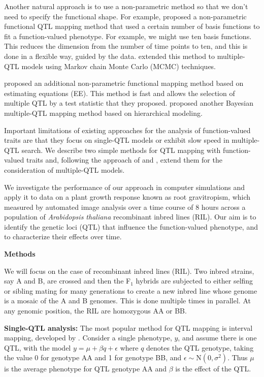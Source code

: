 \documentclass[12pt,letterpaper]{article}
\begin{document}
Another natural approach is to use a non-parametric method so that we don't need
to specify the functional shape. For example, \citet{Yang2009}
proposed a non-parametric functional QTL mapping method that used a certain number
of basis functions to fit a function-valued phenotype. For example,
we might use ten basis functions. This reduces the dimension from the number of
time points to ten, and this is done in a flexible way, guided by the
data. \citet{Min2011} extended this method to multiple-QTL models
using Markov chain Monte Carlo (MCMC) techniques.

\citet{Xiong2011} proposed an additional non-parametric functional mapping
method based on estimating equations (EE). This method is fast
and allows the selection of multiple QTL by a test statistic that they
proposed. \citet{Sillanpaa2012} proposed another Bayesian multiple-QTL
mapping method based on hierarchical modeling.

Important limitations of existing approaches for the
analysis of function-valued traits are that they focus on single-QTL
models or exhibit slow speed in multiple-QTL search. We describe two simple
methods for QTL mapping with function-valued traits and, following the
approach of \citet{Broman2002} and \citet{Manichaikul2009}, extend them
for the consideration of multiple-QTL models.

We investigate the performance of our approach in computer simulations
and apply it to data on a plant growth response known as root
gravitropism, which \citet{Moore2013} measured by automated image analysis over a
time course of 8 hours across a population of \emph{Arabidopsis
thaliana\/} recombinant inbred lines (RIL).
Our aim is to identify the
genetic loci (QTL) that influence the function-valued phenotype, and
to characterize their effects over time.

\clearpage

\centerline{\sffamily \textbf{Methods}}

We will focus on the case of recombinant inbred lines (RIL). Two
inbred strains, say A and B, are crossed and then the F$_1$
hybrids are subjected to either selfing or sibling mating for many
generations to create a new inbred line whose genome is a mosaic of
the A and B genomes. This is done multiple times in parallel. At any
genomic position, the RIL are homozygous AA or BB.

\textbf{Single-QTL analysis:}
The most popular method for QTL mapping is interval mapping, developed by
\citet{Lander1989}. Consider a single phenotype,
$y$, and assume there is one QTL, with the model
$y = \mu + \beta q + \epsilon$
where $q$ denotes the QTL genotype, taking the value 0 for genotype AA and 1
for genotype BB, and $\epsilon \sim \text{N}(0,\sigma^2)$. Thus $\mu$ is the
average phenotype for QTL genotype AA and
$\beta$ is the effect of the QTL.
\end{document}

